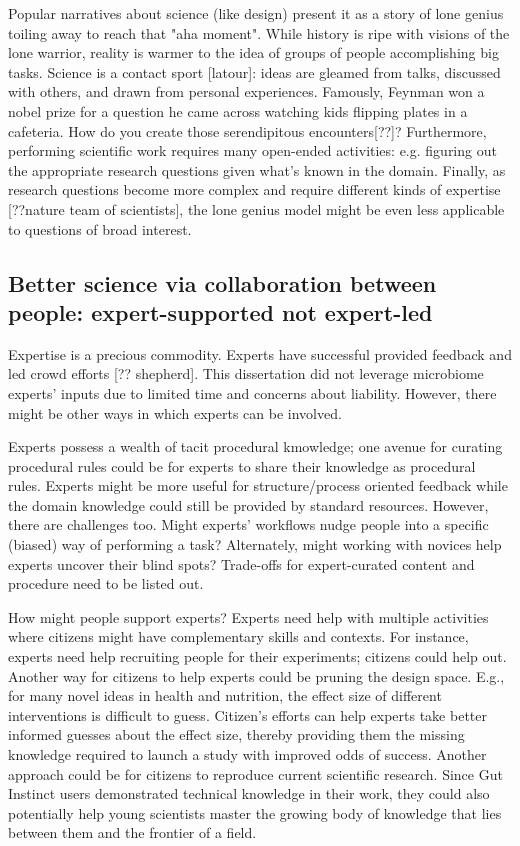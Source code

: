 Popular narratives about science (like design) present it as a story of lone genius toiling away to reach that "aha moment". While history is ripe with visions of the lone warrior, reality is warmer to the idea of groups of people accomplishing big tasks. Science is a contact sport [latour]: ideas are gleamed from talks, discussed with others, and drawn from personal experiences. Famously, Feynman won a nobel prize for a question he came across watching kids flipping plates in a cafeteria. How do you create those serendipitous encounters[??]? Furthermore, performing scientific work requires many open-ended activities: e.g. figuring out the appropriate research questions given what’s known in the domain. Finally, as research questions become more complex and require different kinds of expertise [??nature team of scientists], the lone genius model might be even less applicable to questions of broad interest. 

\subsection{Better science via collaboration between people: expert-supported not expert-led}
Expertise is a precious commodity. Experts have successful provided feedback and led crowd efforts [?? shepherd]. This dissertation did not leverage microbiome experts' inputs due to limited time and concerns about liability. However, there might be other ways in which experts can be involved. 

Experts possess a wealth of tacit procedural kmowledge; one avenue for curating procedural rules could be for experts to share their knowledge as procedural rules.  Experts might be more useful for structure/process oriented feedback while the domain knowledge could still be provided by standard resources. However, there are challenges too. Might experts' workflows nudge people into a specific (biased) way of performing a task? Alternately, might working with novices help experts uncover their blind spots? Trade-offs for expert-curated content and procedure need to be listed out. 

How might people support experts? Experts need help with multiple activities where citizens might have complementary skills and contexts. For instance, experts need help recruiting people for their experiments; citizens could help out.  Another way for citizens to help experts could be pruning the design space. E.g., for many novel ideas in health and nutrition, the effect size of different interventions is difficult to guess. Citizen's efforts can help experts take better informed guesses about the effect size, thereby providing them the missing knowledge required to launch a study with improved odds of success. Another approach could be for citizens to reproduce current scientific research. Since Gut Instinct users demonstrated technical knowledge in their work, they could also potentially help young scientists master the growing body of knowledge that lies between them and the frontier of a field.

